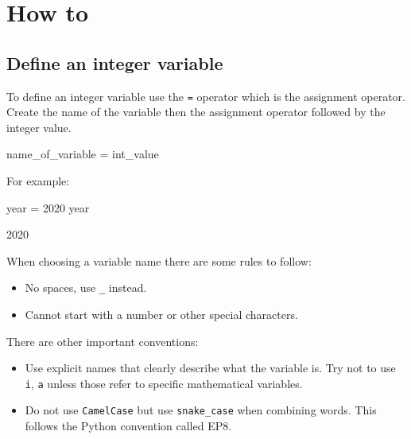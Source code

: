 \section{How to}
\label{\detokenize{building-tools/01-variables-conditionals-loops/how/main:how}}\label{\detokenize{building-tools/01-variables-conditionals-loops/how/main::doc}}

\subsection{Define an integer variable}
\label{\detokenize{building-tools/01-variables-conditionals-loops/how/main:define-an-integer-variable}}

To define an integer variable use the \texttt{=} operator which is the assignment
operator. Create the name of the variable then the assignment operator
followed by the integer value.


\begin{pyin}
name_of_variable = int_value
\end{pyin}



For example:




\begin{pyin}
year = 2020
year
\end{pyin}





\begin{raw}
2020
\end{raw}


\begin{note}
When choosing a variable name there are some rules to follow:
\begin{itemize}
\item 

No spaces, use \texttt{\_} instead.

\item 

Cannot start with a number or other special characters.

\end{itemize}


There are other important conventions:
\begin{itemize}
\item 

Use explicit names that clearly describe what the variable is. Try not to use
\texttt{i}, \texttt{a} unless those refer to specific mathematical variables.

\item 

Do not use \texttt{CamelCase} but use \texttt{snake\_case} when combining words. This follows
the Python convention called EP8.

\end{itemize}
\end{note}



